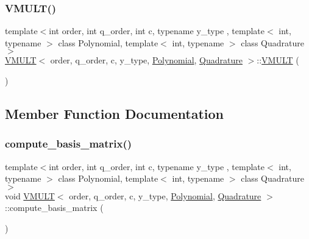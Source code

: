 \subsubsection{\texorpdfstring{V\+M\+U\+L\+T()}{VMULT()}}
{\footnotesize\ttfamily template$<$int order, int q\+\_\+order, int c, typename y\+\_\+type , template$<$ int, typename $>$ class Polynomial, template$<$ int, typename $>$ class Quadrature$>$ \\
\hyperlink{class_v_m_u_l_t}{V\+M\+U\+LT}$<$ order, q\+\_\+order, c, y\+\_\+type, \hyperlink{class_polynomial}{Polynomial}, \hyperlink{class_quadrature}{Quadrature} $>$\+::\hyperlink{class_v_m_u_l_t}{V\+M\+U\+LT} (\begin{DoxyParamCaption}{ }\end{DoxyParamCaption})\hspace{0.3cm}{\ttfamily [inline]}}



\subsection{Member Function Documentation}
\mbox{\label{class_v_m_u_l_t_a0d60b90e214cf4e5d35e3b3c1402ccec}} 
\subsubsection{\texorpdfstring{compute\+\_\+basis\+\_\+matrix()}{compute\_basis\_matrix()}}
{\footnotesize\ttfamily template$<$int order, int q\+\_\+order, int c, typename y\+\_\+type , template$<$ int, typename $>$ class Polynomial, template$<$ int, typename $>$ class Quadrature$>$ \\
void \hyperlink{class_v_m_u_l_t}{V\+M\+U\+LT}$<$ order, q\+\_\+order, c, y\+\_\+type, \hyperlink{class_polynomial}{Polynomial}, \hyperlink{class_quadrature}{Quadrature} $>$\+::compute\+\_\+basis\+\_\+matrix (\begin{DoxyParamCaption}{ }\end{DoxyParamCaption})\hspace{0.3cm}{\ttfamily [inline]}}

\mbox{\label{class_v_m_u_l_t_a51170ad231bce36f2be50c5198a2aec0}} 
